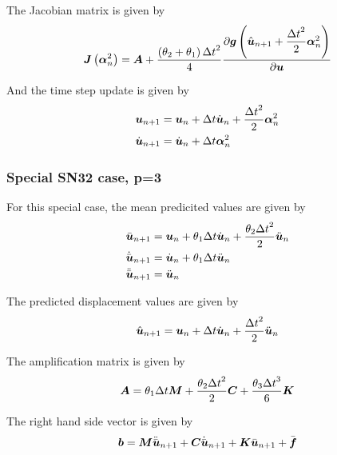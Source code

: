 The Jacobian matrix is given by
\begin{equation}
  \fnof{\matr{J}}{\vectr{\alpha}^{2}_{n}}=\matr{A}+\dfrac{\pbrac{\theta_{2}+\theta_{1}}{\Delta t}^{2}}{4}
  \delby{\fnof{\vectr{g}}{\hat{\vectr{u}}_{n+1}+\dfrac{{\Delta t}^{2}}{2}\vectr{\alpha}^{2}_{n}}}{\vectr{u}}
\end{equation}

And the time step update is given by
\begin{equation}
  \begin{split}
     \boldsymbol{u} _{n+1} &=  \boldsymbol{u} _{n}+\Delta t\dot{ \boldsymbol{u} }_{n} +\dfrac{{\Delta t}^{2}}{2} \boldsymbol{\alpha} ^{2}_{n} \\
    \dot{ \boldsymbol{u} }_{n+1} &= \dot{ \boldsymbol{u} }_{n}+\Delta t \boldsymbol{\alpha} ^{2}_{n} 
  \end{split}
\end{equation}

\subsubsection{Special SN32 case, p=3}

For this special case, the mean predicited values are given by
\begin{equation}
  \begin{split}
    \bar{ \boldsymbol{u} }_{n+1} &=  \boldsymbol{u} _{n}+\theta_{1}\Delta
    t\dot{ \boldsymbol{u} }_{n}+\dfrac{\theta_{2}{\Delta
        t}^{2}}{2}\ddot{ \boldsymbol{u} }_{n}\\
    \dot{\bar{ \boldsymbol{u} }}_{n+1} &=
    \dot{ \boldsymbol{u} }_{n}+\theta_{1}\Delta t\ddot{ \boldsymbol{u} }_{n}\\
    \ddot{\bar{ \boldsymbol{u} }}_{n+1} &= \ddot{ \boldsymbol{u} }_{n}
  \end{split}
\end{equation}

The predicted displacement values are given by
\begin{equation}
   \hat{ \boldsymbol{u} }_{n+1} =  \boldsymbol{u} _{n}+\Delta
   t\dot{ \boldsymbol{u} }_{n}+\dfrac{{\Delta t}^{2}}{2}\ddot{ \boldsymbol{u} }_{n}
\end{equation}

The amplification matrix is given by
\begin{equation}
  \matr{A}=\theta_{1}{\Delta t}\matr{M}+\dfrac{\theta_{2}{\Delta t}^{2}}{2}\matr{C}+\dfrac{\theta_{3}{\Delta t}^{3}}{6}\matr{K}
\end{equation}

The right hand side vector is given by
\begin{equation}
  \vectr{b}=\matr{M}\ddot{\bar{\vectr{u}}}_{n+1}+\matr{C}\dot{\bar{\vectr{u}}}_{n+1}+\matr{K}\bar{\vectr{u}}_{n+1}+\bar{\vectr{f}}
\end{equation}

